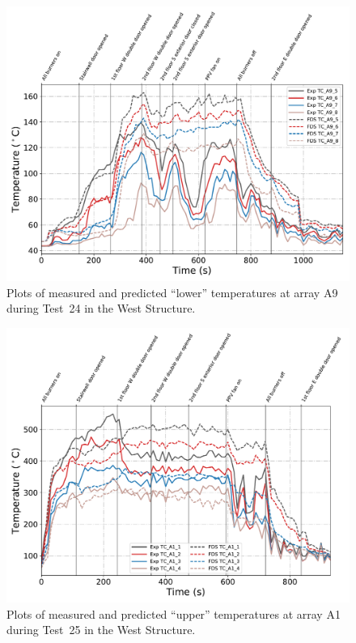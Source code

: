 \begin{figure}[!h]
	\centering
	\includegraphics[width=\columnwidth]{Figures/Plots/Validation/Temperature/Test_24_TC_A9_lower}
	\caption{Plots of measured and predicted ``lower'' temperatures at array A9 during Test~24 in the West Structure.}
	\label{fig:TCA9_lower_data_Test24}
\end{figure}
\begin{figure}[!h]
	\centering
	\includegraphics[width=\columnwidth]{Figures/Plots/Validation/Temperature/Test_25_TC_A1_upper}
	\caption{Plots of measured and predicted ``upper'' temperatures at array A1 during Test~25 in the West Structure.}
	\label{fig:TCA1_upper_data_Test25}
\end{figure}
